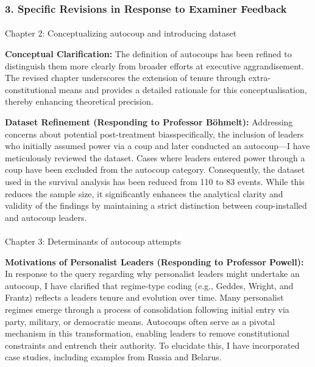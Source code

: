 \documentclass[
  12pt,
  letterpaper,
  DIV=11,
  numbers=noendperiod]{scrartcl}
\makeatletter
\let\oldparagraph\paragraph
\renewcommand{\paragraph}{
    \@ifstar
      \xxxParagraphStar
      \xxxParagraphNoStar
  }
\newcommand{\xxxParagraphStar}[1]{\oldparagraph*{#1}\mbox{}}
\newcommand{\xxxParagraphNoStar}[1]{\oldparagraph{#1}\mbox{}}
\makeatother
\begin{document}
\subsubsection{3. Specific Revisions in Response to Examiner
Feedback}\label{specific-revisions-in-response-to-examiner-feedback}

\paragraph{Chapter 2: Conceptualizing autocoup and introducing
dataset}\label{chapter-2-conceptualizing-autocoup-and-introducing-dataset}

\textbf{Conceptual Clarification:} The definition of autocoups has been
refined to distinguish them more clearly from broader efforts at
executive aggrandisement. The revised chapter underscores the extension
of tenure through extra-constitutional means and provides a detailed
rationale for this conceptualisation, thereby enhancing theoretical
precision.

\textbf{Dataset Refinement (Responding to Professor Böhmelt):}
Addressing concerns about potential post-treatment biasspecifically, the
inclusion of leaders who initially assumed power via a coup and later
conducted an autocoup---I have meticulously reviewed the dataset. Cases
where leaders entered power through a coup have been excluded from the
autocoup category. Consequently, the dataset used in the survival
analysis has been reduced from 110 to 83 events. While this reduces the
sample size, it significantly enhances the analytical clarity and
validity of the findings by maintaining a strict distinction between
coup-installed and autocoup leaders.

\paragraph{Chapter 3: Determinants of autocoup
attempts}\label{chapter-3-determinants-of-autocoup-attempts}

\textbf{Motivations of Personalist Leaders (Responding to Professor
Powell):} In response to the query regarding why personalist leaders
might undertake an autocoup, I have clarified that regime-type coding
(e.g., Geddes, Wright, and Frantz) reflects a leaders tenure and
evolution over time. Many personalist regimes emerge through a process
of consolidation following initial entry via party, military, or
democratic means. Autocoups often serve as a pivotal mechanism in this
transformation, enabling leaders to remove constitutional constraints
and entrench their authority. To elucidate this, I have incorporated
case studies, including examples from Russia and Belarus.
\end{document}
